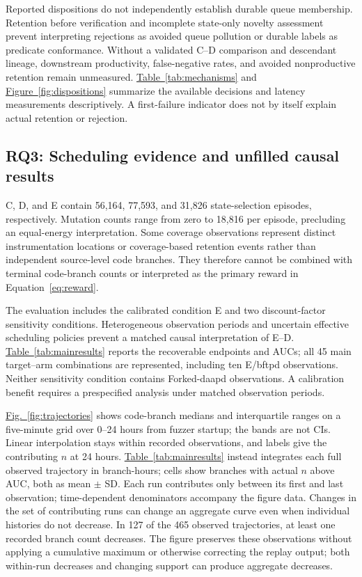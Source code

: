 \documentclass[final,5p,times,number]{elsarticle}
\newcommand{\namedref}[2]{\hyperref[#2]{#1~\ref*{#2}}}
\newcommand{\figref}[1]{\namedref{Fig.}{#1}}
\begin{document}
Reported dispositions do not independently establish durable queue membership. Retention before verification and incomplete state-only novelty assessment prevent interpreting rejections as avoided queue pollution or durable labels as predicate conformance. Without a validated C--D comparison and descendant lineage, downstream productivity, false-negative rates, and avoided nonproductive retention remain unmeasured. \namedref{Table}{tab:mechanisms} and \namedref{Figure}{fig:dispositions} summarize the available decisions and latency measurements descriptively. A first-failure indicator does not by itself explain actual retention or rejection.

\subsection{RQ3: Scheduling evidence and unfilled causal results}
C, D, and E contain 56,164, 77,593, and 31,826 state-selection episodes, respectively. Mutation counts range from zero to 18,816 per episode, precluding an equal-energy interpretation. Some coverage observations represent distinct instrumentation locations or coverage-based retention events rather than independent source-level code branches. They therefore cannot be combined with terminal code-branch counts or interpreted as the primary reward in Equation~\ref{eq:reward}.

The evaluation includes the calibrated condition E and two discount-factor sensitivity conditions. Heterogeneous observation periods and uncertain effective scheduling policies prevent a matched causal interpretation of E--D. \namedref{Table}{tab:mainresults} reports the recoverable endpoints and AUCs; all 45 main target--arm combinations are represented, including ten E/bftpd observations. Neither sensitivity condition contains Forked-daapd observations. A calibration benefit requires a prespecified analysis under matched observation periods.

\figref{fig:trajectories} shows code-branch medians and interquartile ranges on a five-minute grid over 0--24 hours from fuzzer startup; the bands are not CIs. Linear interpolation stays within recorded observations, and labels give the contributing $n$ at 24 hours. \namedref{Table}{tab:mainresults} instead integrates each full observed trajectory in branch-hours; cells show branches with actual $n$ above AUC, both as mean $\pm$ SD. Each run contributes only between its first and last observation; time-dependent denominators accompany the figure data. Changes in the set of contributing runs can change an aggregate curve even when individual histories do not decrease. In 127 of the 465 observed trajectories, at least one recorded branch count decreases. The figure preserves these observations without applying a cumulative maximum or otherwise correcting the replay output; both within-run decreases and changing support can produce aggregate decreases.
\end{document}
